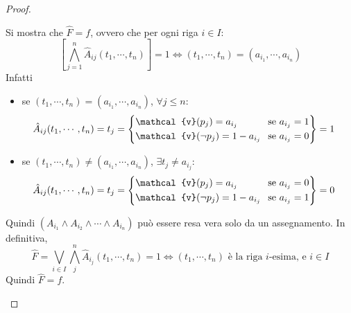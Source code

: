 \begin{proof}
\begin{itemize}
  Si mostra che $\hat{F} = f$, ovvero che per ogni riga $i \in I$:
  $$
  {[ \bigwedge\limits_ {j = 1}^{n} \hat{A}_{ij}(t_1, \cdots, t_n) ]} = 1
  \iff (t_1, \cdots, t_n) = (a_{i_1}, \cdots, a_{i_n})
  $$
  Infatti
  \begin{itemize}
  \item se $(t_1, \cdots, t_n) = (a_{i_1}, \cdots, a_{i_n})$, $\forall j \leq  n$:
    \begin{align*}
      \hat A_{ij}(t_1, \cdots, t_n) = t_j =
      \begin{cases*}
        \mathcal{v}(p_j) = a_{i_j} \\
        \mathcal{v}(\neg p_j) = 1 - a_{i_j}
      \end{cases*}
      &
      \begin{rcases*}
        \text{ se } a_{i_j} = 1 \\
        \text{ se } a_{i_j} = 0
      \end{rcases*} = 1
    \end{align*}
  \item se $(t_1, \cdots, t_n) \neq (a_{i_1}, \cdots, a_{i_n})$, $\exists t_j \neq a_{i_j}$:
    \begin{align*}
      \hat A_{ij}(t_1, \cdots, t_n) = t_j =
      \begin{cases*}
        \mathcal{v}(p_j) = a_{i_j} \\
        \mathcal{v}(\neg p_j) = 1 - a_{i_j}
      \end{cases*}
      &
      \begin{rcases*}
        \text{ se } a_{i_j} = 0 \\
        \text{ se } a_{i_j} = 1
      \end{rcases*} = 0
    \end{align*}
  \end{itemize}
  Quindi $(A_{i_1} \land A_{i_2} \land \cdots \land A_{i_n})$ può essere resa vera solo da un assegnamento. In definitiva, 
  $$
  \hat{F} = \bigvee\limits_{i\in I}\bigwedge\limits_{j}^n \hat A_{i_j}(t_1, \cdots, t_n) = 1 \iff (t_1, \cdots, t_n) \text{ è la riga } i \text{-esima, e } i \in I
  $$
  Quindi $\hat F = f$.  
\end{itemize}
\end{proof}


